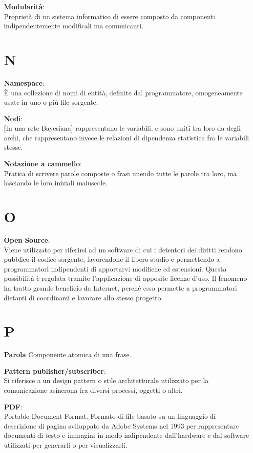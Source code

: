 \documentclass[a4paper, oneside, openany, dvipsnames, table]{article}
\begin{document}
\textbf{Modularità}:\\
Proprietà di un sistema informatico di essere composto da componenti indipendentemente modificali ma comunicanti.


\newpage
\section{N}

\textbf{Namespace}: \\ È una collezione di nomi di entità, definite dal programmatore, omogeneamente usate in uno o più file sorgente.

\textbf{Nodi}:\\ 
{[}In una rete Bayesiana{]} rappresentano le variabili, e sono uniti tra loro da degli archi, che rappresentano invece le relazioni di dipendenza statistica fra le variabili stesse.

\textbf{Notazione a cammello}:\\	Pratica di scrivere parole composte o frasi unendo tutte le parole tra loro, ma lasciando le loro iniziali maiuscole.

\newpage
\section{O}
\textbf{Open Source}:\\	Viene utilizzato per riferirsi ad un software di cui i detentori dei diritti rendono pubblico il codice sorgente, favorendone il libero studio e permettendo a programmatori indipendenti di apportarvi modifiche ed estensioni. Questa possibilità è regolata tramite l'applicazione di apposite licenze d'uso. Il fenomeno ha tratto grande beneficio da Internet, perché esso permette a programmatori distanti di coordinarsi e lavorare allo stesso progetto.

\newpage
\section{P}
\label{par:parola}
\textbf{Parola}
Componente atomica di una frase.

\textbf{Pattern publisher/subscriber}:\\	 Si riferisce a un design pattern o stile architetturale utilizzato per la comunicazione asincrona fra diversi processi, oggetti o altri.

\textbf{PDF}:\\	Portable Document Format. Formato di file basato su un linguaggio di descrizione di pagina sviluppato da Adobe Systems nel 1993 per rappresentare documenti di testo e immagini in modo indipendente dall'hardware e dal software utilizzati per generarli o per visualizzarli.
\end{document}
